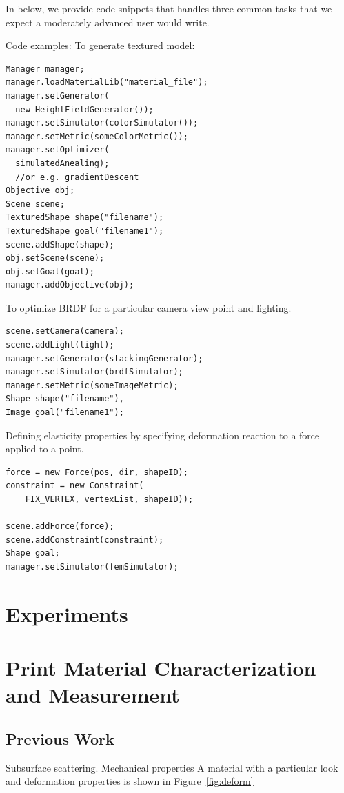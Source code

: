 \documentclass[annual]{acmsiggraph}
\begin{document}
In below, we provide code snippets that handles three common tasks
that we expect a moderately advanced user would write.

Code examples:
To generate textured model:
\begin{verbatim}
Manager manager;
manager.loadMaterialLib("material_file");
manager.setGenerator(
  new HeightFieldGenerator());
manager.setSimulator(colorSimulator());
manager.setMetric(someColorMetric());
manager.setOptimizer(
  simulatedAnealing);
  //or e.g. gradientDescent
Objective obj;
Scene scene;
TexturedShape shape("filename");
TexturedShape goal("filename1");
scene.addShape(shape);
obj.setScene(scene);
obj.setGoal(goal);
manager.addObjective(obj);
\end{verbatim}

To optimize BRDF for a particular camera view point and lighting.
\begin{verbatim}
scene.setCamera(camera);
scene.addLight(light);
manager.setGenerator(stackingGenerator);
manager.setSimulator(brdfSimulator);
manager.setMetric(someImageMetric);
Shape shape("filename"), 
Image goal("filename1");
\end{verbatim}

Defining elasticity properties
by specifying deformation 
reaction to a force applied to a point.

\begin{verbatim}
force = new Force(pos, dir, shapeID);
constraint = new Constraint(
    FIX_VERTEX, vertexList, shapeID));

scene.addForce(force);
scene.addConstraint(constraint);
Shape goal;
manager.setSimulator(femSimulator);
\end{verbatim}

\section{Experiments}
\section{Print Material Characterization and Measurement}

\subsection{Previous Work}
Subsurface scattering. Mechanical properties
A material with a particular
look and deformation properties is shown in Figure~\ref{fig:deform}
\end{document}
